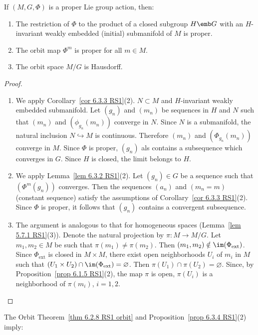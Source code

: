 \begin{prop}[{{\cite[Prop.~6.3.4]{RS1}}}]\label{prop 6.3.4 RS1}
    If $(M,G,\Phi)$ is a proper Lie group action, then:
    \begin{enumerate}
        \item The restriction of $\Phi$ to the product of a closed subgroup $H\emb G$ with an $H$-invariant weakly embedded (initial) submanifold  of $M$ is proper.
        \item The orbit map $\Phi^m$ is proper for all $m\in M$.
        \item The orbit space $M\slash G$ is Hausdorff.
    \end{enumerate}
\end{prop}
\begin{proof}
    \begin{enumerate}
        \item We apply Corollary~\ref{cor 6.3.3 RS1}(2). $N\subset M$ and $H$-invariant weakly embedded submanifold. Let $(g_n)$ and $(m_n)$ be sequences in $H$ and $N$ such that $(m_n)$ and $(\phi_{g_n}(m_n))$ converge in $N$. Since $N$ is a submanifold, the natural inclusion $N\hookrightarrow M$ is continuous. Therefore $(m_n)$ and $(\Phi_{g_n}(m_n))$ converge in $M$. Since $\Phi $ is proper, $(g_n)$ als contains a subsequence which converges in $G$. Since $H$ is closed, the limit belongs to $H$.
        \item We apply Lemma~\ref{lem 6.3.2 RS1}(2). Let $(g_n)\in G$ be a sequence such that $(\Phi^m(g_n))$ converges. Then the sequences $(a_n)$ and $(m_n=m)$ (constant sequence) satisfy the assumptions of Corollary~\ref{cor 6.3.3 RS1}(2). Since $\Phi$ is proper, it follows that $(g_n)$ contains a convergent subsequence.
        \item The argument is analogous to that for homogeneous spaces (Lemma~\ref{lem 5.7.1 RS1}(3)). Denote the natural projection by $\pi:M\to M\slash G$. Let $m_1,m_2\in M$ be such that $\pi(m_1)\neq \pi(m_2)$. Then $(m_1,m_2)\notin \im(\Phi_{\mathrm{ext}})$. Since $\Phi_{\mathrm{ext}}$ is closed in $M\times M$, there exist open neighborhoods $U_i$ of $m_i$ in $M$ such that $(U_1\times U_2)\cap \im(\Phi_{\mathrm{ext}})=\varnothing$. Then $\pi(U_1)\cap\pi(U_2)=\varnothing$. Since, by Proposition~\ref{prop 6.1.5 RS1}(2), the map $\pi$ is open, $\pi(U_i)$ is a neighborhood of $\pi(m_i)$, $i=1,2$.
    \end{enumerate}
\end{proof}


The Orbit Theorem~\ref{thm 6.2.8 RS1 orbit} and Proposition~\ref{prop 6.3.4 RS1}(2) imply:

